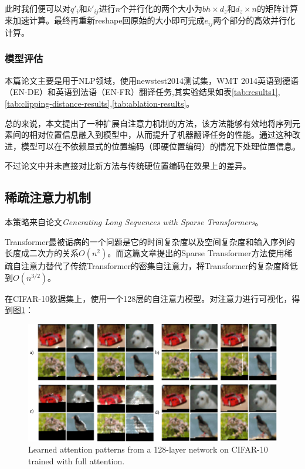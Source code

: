 此时我们便可以对$q'_i$和$k'_{ij}$进行$n$个并行化的两个大小为$bh \times d_z$和$d_z \times n$的矩阵计算来加速计算。最终再重新reshape回原始的大小即可完成$e_{ij}$两个部分的高效并行化计算。
\subsubsection{模型评估}
本篇论文主要是用于NLP领域，使用newstest2014测试集，WMT 2014英语到德语（EN-DE）和英语到法语（EN-FR）翻译任务,其实验结果如表\ref{tab:results1},\ref{tab:clipping-distance-results},\ref{tab:ablation-results}。

总的来说，本文提出了一种扩展自注意力机制的方法，该方法能够有效地将序列元素间的相对位置信息融入到模型中，从而提升了机器翻译任务的性能。通过这种改进，模型可以在不依赖显式的位置编码（即硬位置编码）的情况下处理位置信息。

不过论文中并未直接对比新方法与传统硬位置编码在效果上的差异。


\subsection{稀疏注意力机制}\label{sec-4:sparse-attention}
本策略来自论文\textit{Generating Long Sequences with Sparse Transformers}\citep{childGeneratingLongSequences2019}。

Transformer最被诟病的一个问题是它的时间复杂度以及空间复杂度和输入序列的长度成二次方的关系$O(n^2)$。而这篇文章提出的Sparse Transformer方法使用稀疏自注意力替代了传统Transformer的密集自注意力，将Transformer的复杂度降低到$O(n^{3/2})$。

在CIFAR-10数据集上，使用一个128层的自注意力模型。对注意力进行可视化，得到图\ref{fig:iwslt-wmt1}：

\begin{figure}[h]
    \centering
    \includegraphics[width=\textwidth]{img/SC/SC1.jpg}
    \caption{Learned attention patterns from a 128-layer network on CIFAR-10 trained with full attention.}
    \label{fig:iwslt-wmt1}
\end{figure}

